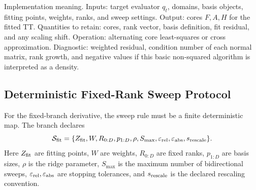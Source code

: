 \documentclass[11pt]{article}
\numberwithin{equation}{section}
\begin{document}
Implementation meaning. Inputs: target evaluator \(q_t\), domains,
basis objects, fitting points, weights, ranks, and sweep settings.  Output:
cores \(F,A,H\) for the fitted TT.  Quantities to retain: cores, rank vector, basis
definition, fit residual, and any scaling shift.  Operation: alternating core
least-squares or cross approximation.  Diagnostic: weighted residual, condition
number of each normal matrix, rank growth, and negative values if this basic
non-squared algorithm is interpreted as a density.

\subsection*{Deterministic Fixed-Rank Sweep Protocol}

For the fixed-branch derivative, the sweep rule must be a finite deterministic
map.  The branch declares
\begin{equation}
    \mathcal S_{\rm fit}
    =
    \{Z_{\rm fit},W,R_{0:D},p_{1:D},\rho,S_{\max},
      \varepsilon_{\rm rel},\varepsilon_{\rm abs},s_{\rm rescale}\}.
    \label{eq:p24-p23-sweep1}
\end{equation}
Here \(Z_{\rm fit}\) are fitting points, \(W\) are weights, \(R_{0:D}\) are
fixed ranks, \(p_{1:D}\) are basis sizes, \(\rho\) is the ridge parameter,
\(S_{\max}\) is the maximum number of bidirectional sweeps,
\(\varepsilon_{\rm rel},\varepsilon_{\rm abs}\) are stopping tolerances, and
\(s_{\rm rescale}\) is the declared rescaling convention.
\end{document}
